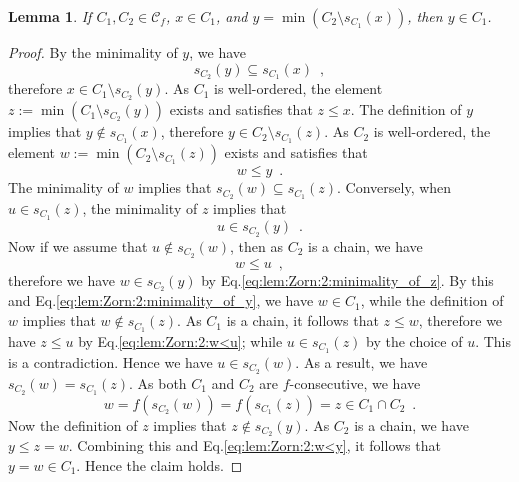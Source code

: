 \documentclass{article}
\newtheorem{lemma}{Lemma}
\begin{document}
\begin{lemma}
    \label{lem:Zorn:2}
    If $C_1,C_2 \in \mathcal{C}_f$, $x \in C_1$, and $y = \min(C_2 \setminus s_{C_1}(x))$, then $y \in C_1$.
\end{lemma}
\begin{proof}
    By the minimality of $y$, we have
    \begin{equation}
        \label{eq:lem:Zorn:2:minimality_of_y}
        s_{C_2}(y) \subseteq s_{C_1}(x) \enspace,
    \end{equation}
    therefore $x \in C_1 \setminus s_{C_2}(y)$.
    As $C_1$ is well-ordered, the element $z := \min(C_1 \setminus s_{C_2}(y))$ exists and satisfies that $z \leq x$.
    The definition of $y$ implies that $y \not\in s_{C_1}(x)$, therefore $y \in C_2 \setminus s_{C_1}(z)$.
    As $C_2$ is well-ordered, the element $w := \min(C_2 \setminus s_{C_1}(z))$ exists and satisfies that
    \begin{equation}
        \label{eq:lem:Zorn:2:w<y}
        w \leq y \enspace.
    \end{equation}
    The minimality of $w$ implies that $s_{C_2}(w) \subseteq s_{C_1}(z)$.
    Conversely, when $u \in s_{C_1}(z)$, the minimality of $z$ implies that
    \begin{equation}
        \label{eq:lem:Zorn:2:minimality_of_z}
        u \in s_{C_2}(y) \enspace.
    \end{equation}
    Now if we assume that $u \not\in s_{C_2}(w)$, then as $C_2$ is a chain, we have
    \begin{equation}
        \label{eq:lem:Zorn:2:w<u}
        w \leq u \enspace,
    \end{equation}
    therefore we have $w \in s_{C_2}(y)$ by Eq.\eqref{eq:lem:Zorn:2:minimality_of_z}.
    By this and Eq.\eqref{eq:lem:Zorn:2:minimality_of_y}, we have $w \in C_1$, while the definition of $w$ implies that $w \not\in s_{C_1}(z)$.
    As $C_1$ is a chain, it follows that $z \leq w$, therefore we have $z \leq u$ by Eq.\eqref{eq:lem:Zorn:2:w<u}; while $u \in s_{C_1}(z)$ by the choice of $u$.
    This is a contradiction.
    Hence we have $u \in s_{C_2}(w)$.
    As a result, we have $s_{C_2}(w) = s_{C_1}(z)$.
    As both $C_1$ and $C_2$ are $f$-consecutive, we have
    \[
        w = f(s_{C_2}(w)) = f(s_{C_1}(z)) = z \in C_1 \cap C_2 \enspace.
    \]
    Now the definition of $z$ implies that $z \not\in s_{C_2}(y)$.
    As $C_2$ is a chain, we have $y \leq z = w$.
    Combining this and Eq.\eqref{eq:lem:Zorn:2:w<y}, it follows that $y = w \in C_1$.
    Hence the claim holds.
\end{proof}
\end{document}
